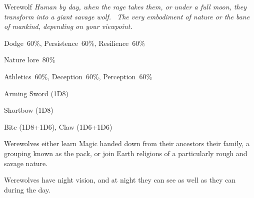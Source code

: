 \newpage


\begin{monsterbox}{Werewolf}
	\textit{Human by day, when the rage takes them, or under a full moon, they transform into a giant savage wolf.  The very embodiment of nature or the bane of mankind, depending on your viewpoint.}\\
	\rpghline
	\basics[%
        hitpoints  = 12, 
	majorwound = 6,
	damagemodifier = +1D6 (wolf),
	powerpoints = 11,
	movementrate = {15m (man), 30m (wolf)},
	armor = Hide (1AP),
	plunderrating = 0
	]
	\rpghline%
	\stats[ %
		STR = 3D6/6D6  (11/22),
		CON = 3D6      (11),
		DEX = 3D6      (11),
		SIZ = 2D6+6    (13),
		INT = 2D6+6/1D6+3 (13/6),
		POW = 3D6      (11),
		CHA = 3D6      (11)
	]
	\rpghline%
	\begin{rpg-monsteraction}[Resistances]
		Dodge~60\%, Persistence~60\%, Resilience~60\%
	\end{rpg-monsteraction}
	\begin{rpg-monsteraction}[Knowledge]
    		Nature lore~80\%
	\end{rpg-monsteraction}
	\begin{rpg-monsteraction}[Practical]
		Athletics~60\%, Deception~60\%, Perception~60\%
	\end{rpg-monsteraction}
	\begin{rpg-monsteraction}
		Arming Sword (1D8)
	\end{rpg-monsteraction}
	\begin{rpg-monsteraction}
		Shortbow (1D8)
	\end{rpg-monsteraction}
	\begin{rpg-monsteraction}
		Bite (1D8+1D6), Claw (1D6+1D6)
	\end{rpg-monsteraction}
	\begin{rpg-monsteraction}[Magic]
		Werewolves either learn Magic handed down from their ancestors their family, a grouping known as the pack, or join Earth religions of a particularly rough and savage nature.
	\end{rpg-monsteraction}
	\begin{rpg-monsteraction}
		Werewolves have night vision, and at night they can see as well as they can during the day.

\end{rpg-monsteraction}
\end{monsterbox}
